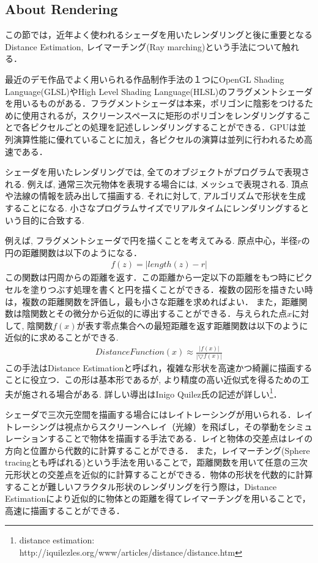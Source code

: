 \subsection{About Rendering}

この節では，近年よく使われるシェーダを用いたレンダリングと後に重要となるDistance Estimation, レイマーチング(Ray marching)という手法について触れる．

最近のデモ作品でよく用いられる作品制作手法の１つにOpenGL Shading Language(GLSL)やHigh Level Shading Language(HLSL)のフラグメントシェーダを用いるものがある．フラグメントシェーダは本来，ポリゴンに陰影をつけるために使用されるが，スクリーンスペースに矩形のポリゴンをレンダリングすることで各ピクセルごとの処理を記述しレンダリングすることができる．GPUは並列演算性能に優れていることに加え，各ピクセルの演算は並列に行われるため高速である．

シェーダを用いたレンダリングでは, 全てのオブジェクトがプログラムで表現される.
例えば,  通常三次元物体を表現する場合には, メッシュで表現される. 
頂点や法線の情報を読み出して描画する.
それに対して, アルゴリズムで形状を生成することになる.  
小さなプログラムサイズでリアルタイムにレンダリングするという目的に合致する. 

例えば, フラグメントシェーダで円を描くことを考えてみる. 
原点中心，半径$r$の円の距離関数は以下のようになる．
\begin{eqnarray*}
 f(z) = | length(z) - r |
\end{eqnarray*}
この関数は円周からの距離を返す．この距離から一定以下の距離をもつ時にピクセルを塗りつぶす処理を書くと円を描くことができる．複数の図形を描きたい時は，複数の距離関数を評価し，最も小さな距離を求めればよい．
また，距離関数は陰関数とその微分から近似的に導出することができる．与えられた点$x$に対して, 陰関数$f(x)$が表す零点集合への最短距離を返す距離関数は以下のように近似的に求めることができる. 
\begin{eqnarray*}
 DistanceFunction(x) \approx \frac{|f(x)|}{|\bigtriangledown f(x)|}
\end{eqnarray*}
この手法はDistance Estimationと呼ばれ，複雑な形状を高速かつ綺麗に描画することに役立つ．この形は基本形であるが, より精度の高い近似式を得るための工夫が施される場合がある. 詳しい導出はInigo Quilez氏の記述が詳しい\footnote{distance estimation: http://iquilezles.org/www/articles/distance/distance.htm}．

シェーダで三次元空間を描画する場合にはレイトレーシングが用いられる．レイトレーシングは視点からスクリーンへレイ（光線）を飛ばし，その挙動をシミュレーションすることで物体を描画する手法である．レイと物体の交差点はレイの方向と位置から代数的に計算することができる．
また，レイマーチング(Sphere tracingとも呼ばれる)\cite{sphereTracing}という手法を用いることで，距離関数を用いて任意の三次元形状との交差点を近似的に計算することができる．物体の形状を代数的に計算することが難しいフラクタル形状のレンダリングを行う際は，Distance Estimationにより近似的に物体との距離を得てレイマーチングを用いることで，高速に描画することができる．

